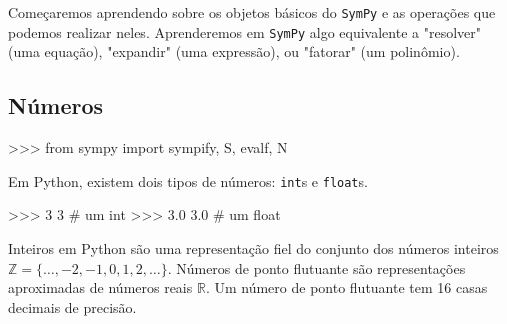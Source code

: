 %


\label{sec:sympytut_fundamentals_of_mathematics}

Começaremos aprendendo sobre os objetos básicos do \texttt{SymPy} e as operações que podemos realizar neles. Aprenderemos em \texttt{SymPy} algo equivalente a "resolver" (uma equação), "expandir" (uma expressão), ou "fatorar" (um polinômio). 

\subsection{Números}
\label{basics:numbers}

\small
\begin{verbatimtab}
>>> from sympy import  sympify, S,  evalf, N
\end{verbatimtab}
\normalsize

\noindent
Em Python, existem dois tipos de números: \texttt{int}s e \texttt{float}s.

\small
\begin{verbatimtab}
>>> 3
3                             # um int
>>> 3.0
3.0                           # um float 
\end{verbatimtab}
\normalsize

	\noindent
	Inteiros em Python são uma representação fiel do conjunto dos números inteiros $\mathbb{Z}=\{\ldots,-2,-1,0,1,2,\ldots\}$.
	Números de ponto flutuante são representações aproximadas de números reais $\mathbb{R}$.
	Um número de ponto flutuante tem 16 casas decimais de precisão.
	


